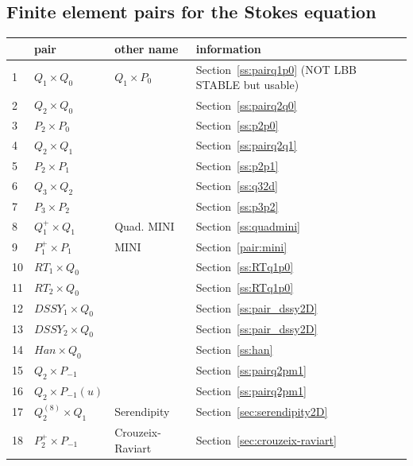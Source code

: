 \subsection*{Finite element pairs for the Stokes equation}

\begin{center}
\begin{tabular}{p{1cm}p{2cm}p{4cm}p{8cm}}
\hline
 &pair & other name & information \\
\hline
\hline
 1&$Q_1\times Q_0$       & $Q_1\times P_0$  & Section~\ref{ss:pairq1p0} (NOT LBB STABLE but usable)\\
 2&$Q_2\times Q_0$       &                  & Section~\ref{ss:pairq2q0}\\
 3&$P_2\times P_0$       &                  & Section~\ref{ss:p2p0}\\ 
 4&$Q_2\times Q_1$       &                  & Section~\ref{ss:pairq2q1}\\
 5&$P_2\times P_1$       &                  & Section~\ref{ss:p2p1}\\
 6&$Q_3\times Q_2$       &                  & Section~\ref{ss:q32d}\\
 7&$P_3\times P_2$       &                  & Section~\ref{ss:p3p2}\\
 8&$Q_1^+\times Q_1$     & Quad. MINI       & Section~\ref{ss:quadmini}\\
 9&$P_1^{+}\times P_{1}$ & MINI             & Section~\ref{pair:mini}\\
10&$RT_1\times Q_0$      &                  & Section~\ref{ss:RTq1p0}\\
11&$RT_2\times Q_0$      &                  & Section~\ref{ss:RTq1p0}\\
12&$DSSY_1\times Q_0$    &                  & Section~\ref{ss:pair_dssy2D}\\
13&$DSSY_2\times Q_0$    &                  & Section~\ref{ss:pair_dssy2D}\\
14&$Han\times Q_0$       &                  & Section~\ref{ss:han}\\
15&$Q_2\times P_{-1}$    &                  & Section~\ref{ss:pairq2pm1}\\
16&$Q_2\times P_{-1}(u)$ &                  & Section~\ref{ss:pairq2pm1}\\
17&$Q_2^{(8)}\times Q_1$ & Serendipity      & Section~\ref{sec:serendipity2D}\\
18&$P_2^+\times P_{-1}$  & Crouzeix-Raviart & Section~\ref{sec:crouzeix-raviart}\\

\end{tabular}
\end{center}
